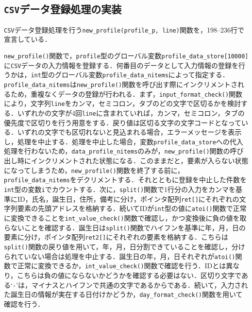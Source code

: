 \subsection{\texttt{CSV}データ登録処理の実装}

\verb|CSV|データ登録処理を行う\verb|new_profile(profile_p, line)|関数を，198--236行で宣言している．

\verb|new_profile()|関数で，\verb|profile|型のグローバル変数\verb|profile_data_store[10000]|に\verb|CSV|データの入力情報を登録する．何番目のデータとして入力情報の登録を行うかは，\verb|int|型のグローバル変数\verb|profile_data_nitems|によって指定する．\verb|profile_data_nitems|は\verb|new_profile()|関数を呼び出す際にインクリメントされるため，重複なくデータの登録が行われる．まず，\verb|input_format_check()|関数により，文字列\verb|line|をカンマ，セミコロン，タブのどの文字で区切るかを検討する．いずれかの文字が4回\verb|line|に含まれていれば，カンマ，セミコロン，タブの優先度で区切りを行う用意をする．戻り値は区切る文字の文字コードとなっている．いずれの文字でも区切れないと見込まれる場合，エラーメッセージを表示し，処理を中止する．処理を中止した場合，変数\verb|profile_data_store|への代入処理を行わないため，\verb|data_profile_nitems|のみが，\verb|new_profile()|関数の呼び出し時にインクリメントされた状態になる．このままだと，要素が入らない状態になってしまうため，\verb|new_profile()|関数を終了する前に，\verb|profile_data_nitems|をデクリメントする．それとともに登録を中止した件数を\verb|int|型の変数\verb|i|でカウントする．次に，\verb|split()|関数で1行分の入力をカンマを基準にID，氏名，誕生日，住所，備考に分け，ポインタ配列\verb|ret[]|にそれぞれの文字列要素の先頭アドレスを格納する．続いてIDが\verb|int|型の値に\verb|atoi()|関数で正常に変換できることを\verb|int_value_check()|関数で確認し，かつ変換後に負の値を取らないことを確認する．誕生日は\verb|split()|関数でハイフンを基準に年，月，日の要素に分け，ポインタ配列\verb|ret2[]|にそれぞれの要素を格納する．こちらは\verb|split()|関数の戻り値を用いて，年，月，日分割できていることを確認し，分けられていない場合は処理を中止する．誕生日の年，月，日それぞれが\verb|atoi()|関数で正常に変換できるか，\verb|int_value_check()|関数で確認を行う．IDとは異なり，こちらは負の値にならないかどうかを確認する必要はない．区切り文字である‘\verb|-|’は，マイナスとハイフンで共通の文字であるからである．続いて，入力された誕生日の情報が実在する日付けかどうか，\verb|day_format_check()|関数を用いて確認を行う．

